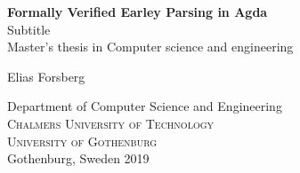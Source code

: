 

\newcommand{\me}{Elias Forsberg}
\newcommand{\titleA}{Formally Verified Earley Parsing in Agda}
\newcommand{\titleB}{Subtitle}

\begin{titlepage}
			
\addtolength{\voffset}{2cm}

\begin{figure}[H]
\centering
\vspace{1cm}	%
\end{figure}

\mbox{}
\vfill
\renewcommand{\familydefault}{\sfdefault} \normalfont %
\textbf{{\Huge 	\titleA	%
		}} 	\\[0.5cm]
{\Large \titleB}\\[0.5cm]
Master's thesis in Computer science and engineering \vspace{1cm}

{\Large \me} \vspace{2.9cm}

Department of Computer Science and Engineering \\
\textsc{Chalmers University of Technology} \\
\textsc{University of Gothenburg} \\
Gothenburg, Sweden 2019

\renewcommand{\familydefault}{\rmdefault} \normalfont %
\end{titlepage}


\newpage
\restoregeometry
\thispagestyle{empty}
\mbox{}


